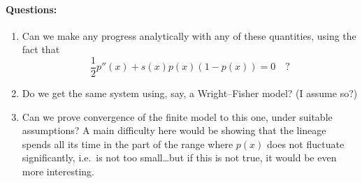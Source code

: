 \documentclass{article}
\begin{document}
\paragraph{Questions:} 
\begin{enumerate}

    \item Can we make any progress analytically with any of these quantities,
      using the fact that
      \[ \frac{1}{2} p''(x) + s(x) p(x)(1-p(x)) = 0 \quad ?\]

    \item Do we get the same system using, say, a Wright--Fisher model?  (I assume so?)

    \item Can we prove convergence of the finite model to this one, under suitable assumptions?  A main difficulty here would be showing that the lineage spends all its time in the part of the range where $p(x)$ does not fluctuate significantly, i.e.\ is not too small\ldots but if this is not true, it would be even more interesting.

\end{enumerate}
\end{document}
